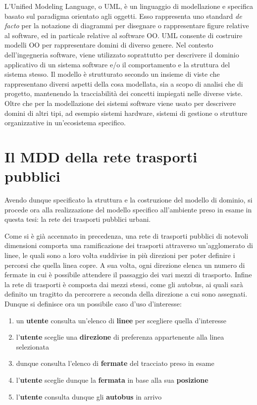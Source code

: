L'Unified Modeling Language, o UML, è un linguaggio di modellazione e specifica basato sul paradigma orientato agli oggetti. Esso rappresenta 
uno standard {\itshape de facto} per la notazione di diagrammi per disegnare o rappresentare figure relative al software, ed in particale relative al software OO.
UML consente di costruire modelli OO per rappresentare domini di diverso genere. Nel contesto dell'ingegneria software, viene utilizzato soprattutto per descrivere il dominio applicativo di un sistema software e/o il comportamento e la struttura del sistema stesso.
Il modello è strutturato secondo un insieme di viste che rappresentano diversi aspetti della cosa modellata, sia a scopo di analisi che di progetto, mantenendo la tracciabilità dei concetti impiegati nelle diverse viste. Oltre che per la modellazione dei sistemi software viene usato per descrivere domini di altri tipi, ad esempio sistemi hardware, sistemi di gestione o strutture organizzative in un'ecosistema specifico. 



\section{Il MDD della rete trasporti pubblici} %
\label{sec:il_MDD_della_rete_trasporti_pubblici}

Avendo dunque specificato la struttura e la costruzione del modello di dominio, si procede ora alla realizzazione del modello specifico all'ambiente preso in esame in questa tesi: la rete dei trasporti pubblici urbani.

Come si è già accennato in precedenza, una rete di trasporti pubblici di notevoli dimensioni comporta una ramificazione dei trasporti attraverso un'agglomerato di linee, le quali sono a loro volta suddivise in più direzioni per poter definire i percorsi che quella linea copre.
A sua volta, ogni direzione elenca un numero di fermate in cui è possibile attendere il passaggio dei vari mezzi di trasporto. Infine la rete di trasporti è composta dai mezzi stessi, come gli autobus, ai quali sarà definito un tragitto da percorrere a seconda della direzione a cui sono assegnati.
\newpage
Dunque si definisce ora un possibile caso d'uso d'interesse:
\begin{enumerate}
   \item un {\bfseries utente} consulta un'elenco di {\bfseries linee} per scegliere quella d'interesse
   \item l'{\bfseries utente} sceglie una {\bfseries direzione} di preferenza appartenente alla linea selezionata
   \item dunque consulta l'elenco di {\bfseries fermate} del tracciato preso in esame
   \item l'{\bfseries utente} sceglie dunque la {\bfseries fermata} in base alla sua {\bfseries posizione}
   \item l'{\bfseries utente} consulta dunque gli {\bfseries autobus} in arrivo
\end{enumerate}

